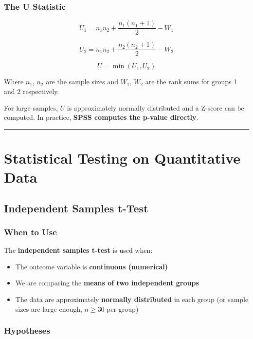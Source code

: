 \documentclass[
  12pt,
  letterpaper,
]{book}
\providecommand{\tightlist}{%
  \setlength{\itemsep}{0pt}\setlength{\parskip}{0pt}}
\begin{document}
\subsection{The U Statistic}\label{the-u-statistic}

\[U_1 = n_1 n_2 + \frac{n_1(n_1+1)}{2} - W_1\]

\[U_2 = n_1 n_2 + \frac{n_2(n_2+1)}{2} - W_2\]

\[U = \min(U_1, U_2)\]

Where \(n_1\), \(n_2\) are the sample sizes and \(W_1\), \(W_2\) are the
rank sums for groups 1 and 2 respectively.

For large samples, \(U\) is approximately normally distributed and a
Z-score can be computed. In practice, \textbf{SPSS computes the p-value
directly}.

\begin{center}\rule{0.5\linewidth}{0.5pt}\end{center}


\chapter{Statistical Testing on Quantitative
Data}\label{statistical-testing-on-quantitative-data}

\section{Independent Samples t-Test}\label{independent-samples-t-test}

\subsection{When to Use}\label{when-to-use-2}

The \textbf{independent samples t-test} is used when:

\begin{itemize}
\tightlist
\item
  The outcome variable is \textbf{continuous (numerical)}
\item
  We are comparing the \textbf{means of two independent groups}
\item
  The data are approximately \textbf{normally distributed} in each group
  (or sample sizes are large enough, \(n \geq 30\) per group)
\end{itemize}

\subsection{Hypotheses}\label{hypotheses}
\end{document}
